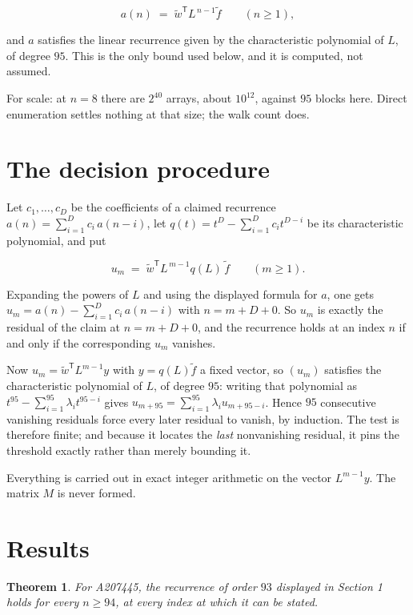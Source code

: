 \documentclass[11pt]{article}
\newtheorem{theorem}{Theorem}
\theoremstyle{definition}
\begin{document}
\[a(n) \;=\; \tilde w^{\mathsf T} L^{\,n-1} \tilde f \qquad (n \ge 1),\]

and $a$ satisfies the linear recurrence given by the characteristic polynomial of $L$, of degree $95$. This is the only bound used below, and it is computed, not assumed.

For scale: at $n = 8$ there are $2^{40}$ arrays, about $10^{12}$, against $95$ blocks here. Direct enumeration settles nothing at that size; the walk count does.

\section{The decision procedure}

Let $c_1,\dots,c_D$ be the coefficients of a claimed recurrence $a(n) = \sum_{i=1}^{D} c_i\,a(n-i)$, let $q(t) = t^{D} - \sum_{i=1}^{D} c_i t^{D-i}$ be its characteristic polynomial, and put

\[u_m \;=\; \tilde w^{\mathsf T} L^{\,m-1} q(L)\,\tilde f \qquad (m \ge 1).\]

Expanding the powers of $L$ and using the displayed formula for $a$, one gets $u_m = a(n) - \sum_{i=1}^{D} c_i\,a(n-i)$ with $n = m + D + 0$. So $u_m$ is exactly the residual of the claim at $n = m + D + 0$, and the recurrence holds at an index $n$ if and only if the corresponding $u_m$ vanishes.

Now $u_m = \tilde w^{\mathsf T} L^{m-1} y$ with $y = q(L)\tilde f$ a fixed vector, so $(u_m)$ satisfies the characteristic polynomial of $L$, of degree $95$: writing that polynomial as $t^{95} - \sum_{i=1}^{95} \lambda_i t^{95-i}$ gives $u_{m+95} = \sum_{i=1}^{95} \lambda_i u_{m+95-i}$. Hence $95$ consecutive vanishing residuals force every later residual to vanish, by induction. The test is therefore finite; and because it locates the {\itshape last} nonvanishing residual, it pins the threshold exactly rather than merely bounding it.

Everything is carried out in exact integer arithmetic on the vector $L^{m-1}y$. The matrix $M$ is never formed.

\section{Results}

\begin{theorem} For A207445, the recurrence of order $93$ displayed in Section 1 holds for every $n \ge 94$, at every index at which it can be stated.\end{theorem}
\end{document}

